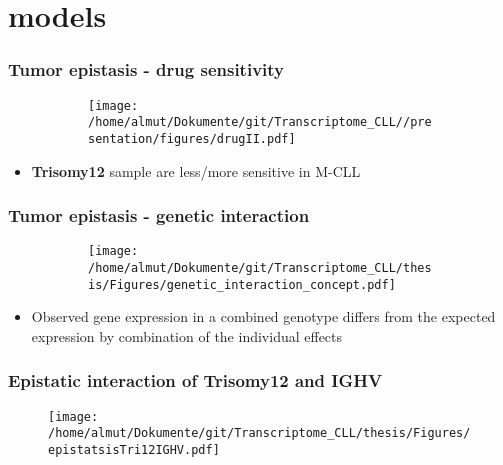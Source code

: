 \documentclass[xcolor=dvipsnames,t,10pt]{beamer}
\begin{document}
\section{models}
%
%
\begin{frame}[c]
	\frametitle{Tumor epistasis - drug sensitivity}
	\begin{figure}
		\centering
		\begin{subfigure}[t]{0.65\columnwidth}
			\texttt{[image: /home/almut/Dokumente/git/Transcriptome\_CLL//presentation/figures/drugII.pdf]}
		\end{subfigure}
		\hfill
	\end{figure}
	\begin{itemize}
		\item \textbf{Trisomy12} sample are less/more sensitive in M-CLL
	\end{itemize}
\end{frame}
%
%
\begin{frame}[c]
	\frametitle{Tumor epistasis - genetic interaction}
	\begin{figure}
		\centering
		\begin{subfigure}[t]{0.45\columnwidth}
			\texttt{[image: /home/almut/Dokumente/git/Transcriptome\_CLL/thesis/Figures/genetic\_interaction\_concept.pdf]}
		\end{subfigure}
	\end{figure}
	\begin{itemize}
		\item Observed gene expression in a combined genotype differs from the expected expression by combination of the individual effects
	\end{itemize}
\end{frame}
%
%
\begin{frame}[c]
	\frametitle{Epistatic interaction of Trisomy12 and IGHV}
	\begin{figure}
		\centering
		\texttt{[image: /home/almut/Dokumente/git/Transcriptome\_CLL/thesis/Figures/epistatsisTri12IGHV.pdf]}
	\end{figure}
\end{frame}
%
%
\end{document}

